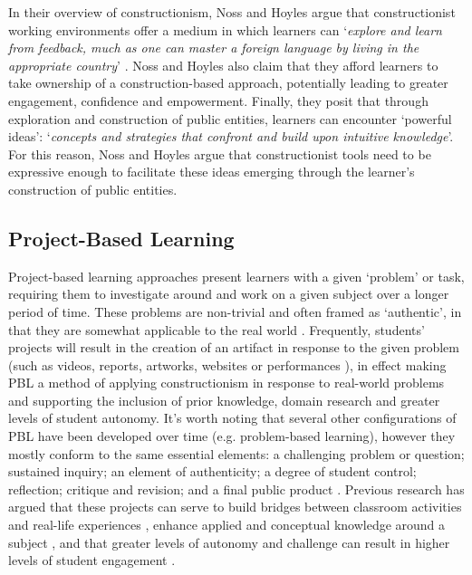 \documentclass[,hyphens]{sigchi}
\begin{document}
In their overview of constructionism, Noss and Hoyles argue that constructionist working environments offer a medium in which learners can `\textit{explore and learn from feedback, much as one can master a foreign language by living in the appropriate country}' \cite{Noss2017}. Noss and Hoyles also claim that they afford learners to take ownership of a construction-based approach, potentially leading to greater engagement, confidence and empowerment. Finally, they posit that through exploration and construction of public entities, learners can encounter `powerful ideas': `\textit{concepts and strategies  that confront and build upon intuitive knowledge}'. For this reason, Noss and Hoyles argue that constructionist tools need to be expressive enough to facilitate these ideas emerging through the learner's construction of public entities.

\subsection{Project-Based Learning}
Project-based learning approaches present learners with a given `problem' or task, requiring them to investigate around and work on a given subject over a longer period of time. These problems are non-trivial and often framed as `authentic', in that they are somewhat applicable to the real world \cite{Blumenfeld1991}. Frequently, students' projects will result in the creation of an artifact in response to the given problem (such as videos, reports, artworks, websites or performances \cite{Holubova2008}), in effect making PBL a method of applying constructionism in response to real-world problems and supporting the inclusion of prior knowledge, domain research and greater levels of student autonomy. It's worth noting that several other configurations of PBL have been developed over time (e.g. problem-based learning), however they mostly conform to the same essential elements: a challenging problem or question; sustained inquiry; an element of authenticity; a degree of student control; reflection; critique and revision; and a final public product \cite{Larmer2015}. Previous research has argued that these projects can serve to build bridges between classroom activities and real-life experiences \cite{Blumenfeld1991}, enhance applied and conceptual knowledge around a subject \cite{Boaler1999}, and that greater levels of autonomy and challenge can result in higher levels of student engagement \cite{Wurdinger2007}.
\end{document}
